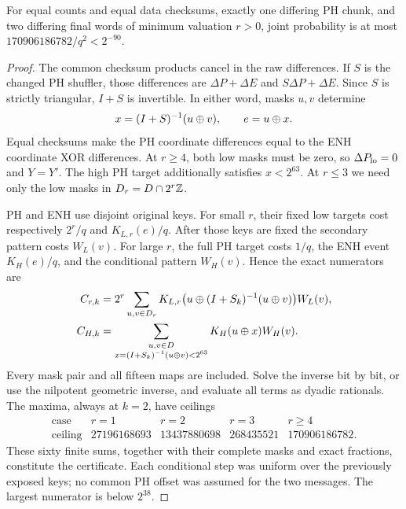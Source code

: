 \begin{theorem}\label{thm:phenh}
For equal counts and equal data checksums, exactly one differing PH chunk, and two differing final words of minimum valuation $r>0$, joint probability is at most $170906186782/q^2<2^{-90}$.
\end{theorem}
\begin{proof}
The common checksum products cancel in the raw differences. If $S$ is the changed PH shuffler, those differences are $\Delta P+\Delta E$ and $S\Delta P+\Delta E$. Since $S$ is strictly triangular, $I+S$ is invertible. In either word, masks $u,v$ determine
\begin{equation}\label{eq:eliminate}
 x=(I+S)^{-1}(u\mathbin\oplus v),\qquad e=u\mathbin\oplus x.
\end{equation}
Equal checksums make the PH coordinate differences equal to the ENH coordinate XOR differences. At $r\ge4$, both low masks must be zero, so $\Delta P_{\mathrm{lo}}=0$ and $Y=Y'$. The high PH target additionally satisfies $x<2^{63}$. At $r\le3$ we need only the low masks in $D_r=D\cap2^r\mathbb Z$.

PH and ENH use disjoint original keys. For small $r$, their fixed low targets cost respectively $2^r/q$ and $K_{L,r}(e)/q$. After those keys are fixed the secondary pattern costs $W_L(v)$. For large $r$, the full PH target costs $1/q$, the ENH event $K_H(e)/q$, and the conditional pattern $W_H(v)$. Hence the exact numerators are
\begin{align}
 C_{r,k}&=2^r\sum_{u,v\in D_r}K_{L,r}\bigl(u\mathbin\oplus(I+S_k)^{-1}(u\mathbin\oplus v)\bigr)W_L(v),\label{eq:jointlow}\\
 C_{H,k}&=\sum_{\substack{u,v\in D\\x=(I+S_k)^{-1}(u\mathbin\oplus v)<2^{63}}}
 K_H(u\mathbin\oplus x)W_H(v).\label{eq:jointhigh}
\end{align}
Every mask pair and all fifteen maps are included. Solve the inverse bit by bit, or use the nilpotent geometric inverse, and evaluate all terms as dyadic rationals. The maxima, always at $k=2$, have ceilings
\[
\begin{array}{c|rrrr}
\text{case}&r=1&r=2&r=3&r\ge4\\\hline
\text{ceiling}&27196168693&13437880698&268435521&170906186782.
\end{array}
\]
These sixty finite sums, together with their complete masks and exact fractions, constitute the certificate. Each conditional step was uniform over the previously exposed keys; no common PH offset was assumed for the two messages. The largest numerator is below $2^{38}$.
\end{proof}
